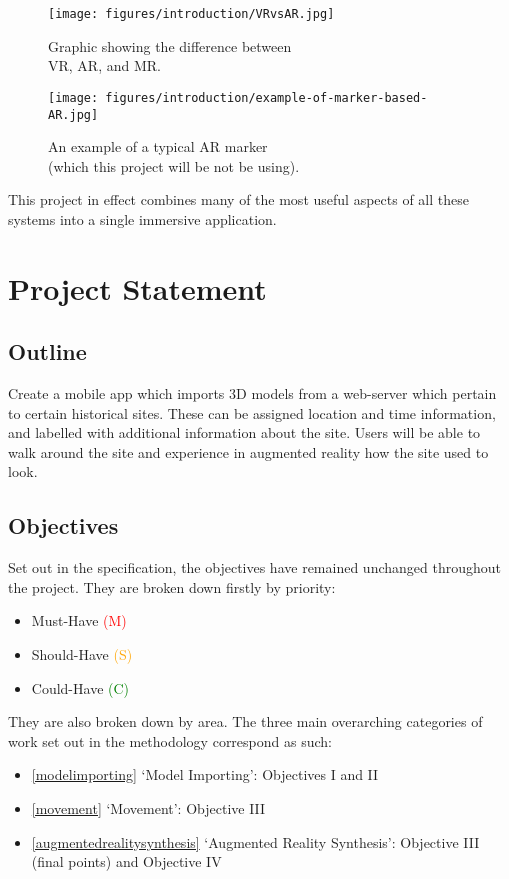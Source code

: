 \documentclass{article}
\newcommand{\must}[1]{\textcolor{red}{#1}}
\newcommand{\should}[1]{\textcolor{orange}{#1}}
\newcommand{\could}[1]{\textcolor{green}{#1}}
\begin{document}
\begin{figure}[H]
\centering
\begin{minipage}{.5\textwidth}
  \centering
  \texttt{[image: figures/introduction/VRvsAR.jpg]}
  \caption{Graphic showing the difference between \\ VR, AR, and MR. \cite{originality:arvrmr}}
  \label{fig:VRvsAR}
\end{minipage}%
\begin{minipage}{.5\textwidth}
  \centering
  \texttt{[image: figures/introduction/example-of-marker-based-AR.jpg]}
  \caption{An example of a typical AR marker \\ (which this project will be not be using). \cite{originality:armarker}}
  \label{fig:ARmarker}
\end{minipage}
\end{figure}

This project in effect combines many of the most useful aspects of all these systems into a single immersive application.

\section{Project Statement}
\subsection{Outline}
Create a mobile app which imports 3D models from a web-server which pertain to certain historical sites. These can be assigned location and time information, and labelled with additional information about the site. Users will be able to walk around the site and experience in augmented reality how the site used to look.

\subsection{Objectives}
\label{Objectives}
Set out in the specification, the objectives have remained unchanged throughout the project. They are broken down firstly by priority: 
\begin{itemize}
    \item Must-Have \must{(M)}
    \item Should-Have \should{(S)}
    \item Could-Have \could{(C)}
\end{itemize}

They are also broken down by area. The three main overarching categories of work set out in the methodology correspond as such:
\begin{itemize}
    \item \ref{modelimporting} `Model Importing': Objectives I and II 
    \item \ref{movement} `Movement': Objective III 
    \item \ref{augmentedrealitysynthesis} `Augmented Reality Synthesis': Objective III (final points) and Objective IV 
\end{itemize}
\end{document}
